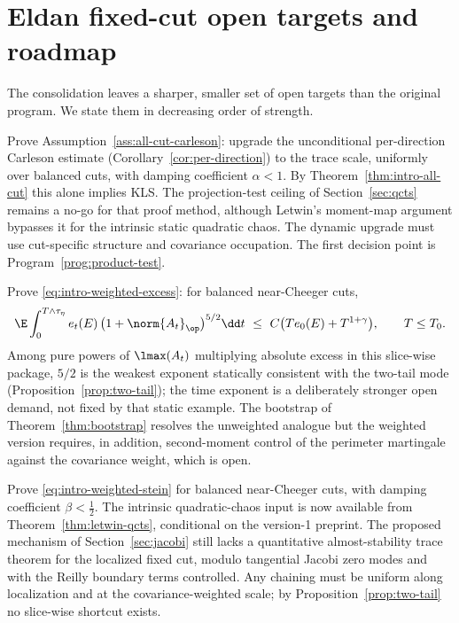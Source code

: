 \documentclass[../../main.tex]{subfiles}
\begin{document}
\section{Eldan fixed-cut open targets and roadmap}
\label{sec:open}

The consolidation leaves a sharper, smaller set of open targets than the original program. We
state them in decreasing order of strength.

\begin{question}
\label{q:upgrade}
Prove Assumption~\ref{ass:all-cut-carleson}: upgrade the unconditional per-direction Carleson
estimate (Corollary~\ref{cor:per-direction}) to the trace scale, uniformly over balanced cuts,
with damping coefficient $\alpha<1$. By Theorem~\ref{thm:intro-all-cut} this alone implies KLS.
The projection-test ceiling of Section~\ref{sec:qcts} remains a no-go for that proof method,
although Letwin's moment-map argument bypasses it for the intrinsic static quadratic chaos. The
dynamic upgrade must use cut-specific structure and covariance occupation. The first
decision point is Program~\ref{prog:product-test}.
\end{question}

\begin{question}
\label{q:weighted}
Prove \eqref{eq:intro-weighted-excess}: for balanced near-Cheeger cuts,
\[
  \E\int_0^{T\wedge\tau_\eta}e_t(E)\,\bigl(1+\norm{A_t}_\op\bigr)^{5/2}\dd t
  \ \le\ C\bigl(Te_0(E)+T^{1+\gamma}\bigr),\qquad T\le T_0 .
\]
Among pure powers of $\lmax(A_t)$ multiplying absolute excess in this slice-wise package,
$5/2$ is the weakest exponent statically consistent with the two-tail mode
(Proposition~\ref{prop:two-tail}); the time exponent is a deliberately stronger open demand,
not fixed by that static example. The bootstrap of Theorem~\ref{thm:bootstrap} resolves the
unweighted analogue but the weighted version requires, in addition, second-moment control of
the perimeter martingale against the covariance weight, which is open.
\end{question}

\begin{question}
\label{q:stein-weighted}
Prove \eqref{eq:intro-weighted-stein} for balanced near-Cheeger cuts, with damping coefficient
$\beta<\tfrac12$. The intrinsic quadratic-chaos input is now available from
Theorem~\ref{thm:letwin-qcts}, conditional on the version-1 preprint. The proposed mechanism of
Section~\ref{sec:jacobi} still lacks a quantitative almost-stability trace theorem for the
localized fixed cut, modulo tangential Jacobi zero modes and with the Reilly boundary terms
controlled. Any chaining must be uniform along localization and at the covariance-weighted scale; by
Proposition~\ref{prop:two-tail} no slice-wise shortcut exists.
\end{question}
\end{document}
